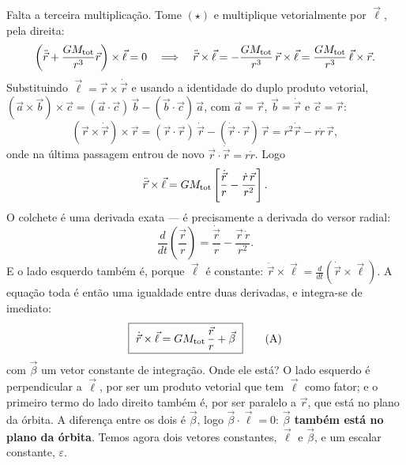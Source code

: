 \documentclass[11pt,a4paper]{article}
\begin{document}
Falta a terceira multiplicação. Tome $(\star)$ e multiplique vetorialmente por $\vec{\ell}$, pela direita:
\[
\left(\ddot{\vec{r}}+\frac{GM_{\rm tot}}{r^{3}}\vec{r}\right)\times\vec{\ell}=0
\quad\Longrightarrow\quad
\ddot{\vec{r}}\times\vec{\ell}=-\frac{GM_{\rm tot}}{r^{3}}\,\vec{r}\times\vec{\ell}
=\frac{GM_{\rm tot}}{r^{3}}\,\vec{\ell}\times\vec{r}.
\]
Substituindo $\vec{\ell}=\vec{r}\times\dot{\vec{r}}$ e usando a identidade do duplo produto vetorial,
$(\vec{a}\times\vec{b})\times\vec{c}=(\vec{a}\cdot\vec{c})\,\vec{b}-(\vec{b}\cdot\vec{c})\,\vec{a}$, com
$\vec{a}=\vec{r}$, $\vec{b}=\dot{\vec{r}}$ e $\vec{c}=\vec{r}$:
\[
\left(\vec{r}\times\dot{\vec{r}}\right)\times\vec{r}
=(\vec{r}\cdot\vec{r})\,\dot{\vec{r}}-(\dot{\vec{r}}\cdot\vec{r})\,\vec{r}
=r^{2}\dot{\vec{r}}-r\dot{r}\,\vec{r},
\]
onde na última passagem entrou de novo $\vec{r}\cdot\dot{\vec{r}}=r\dot{r}$. Logo
\[
\ddot{\vec{r}}\times\vec{\ell}
=GM_{\rm tot}\left[\frac{\dot{\vec{r}}}{r}-\frac{\dot{r}\,\vec{r}}{r^{2}}\right].
\]
O colchete é uma derivada exata --- é precisamente a derivada do versor radial:
\[
\frac{d}{dt}\left(\frac{\vec{r}}{r}\right)
=\frac{\dot{\vec{r}}}{r}-\frac{\vec{r}\,\dot{r}}{r^{2}}.
\]
E o lado esquerdo também é, porque $\vec{\ell}$ é constante:
$\ddot{\vec{r}}\times\vec{\ell}=\frac{d}{dt}(\dot{\vec{r}}\times\vec{\ell})$. A equação toda é então uma
igualdade entre duas derivadas, e integra-se de imediato:
\begin{equation}
\boxed{\ \dot{\vec{r}}\times\vec{\ell}=GM_{\rm tot}\,\frac{\vec{r}}{r}+\vec{\beta}\ }
\tag{A}
\end{equation}
com $\vec{\beta}$ um vetor constante de integração. Onde ele está? O lado esquerdo é perpendicular a
$\vec{\ell}$, por ser um produto vetorial que tem $\vec{\ell}$ como fator; e o primeiro termo do lado direito
também é, por ser paralelo a $\vec{r}$, que está no plano da órbita. A diferença entre os dois é $\vec{\beta}$,
logo $\vec{\beta}\cdot\vec{\ell}=0$: \textbf{$\vec{\beta}$ também está no plano da órbita}.
Temos agora dois vetores constantes, $\vec{\ell}$ e $\vec{\beta}$, e um escalar constante, $\varepsilon$.
\end{document}
